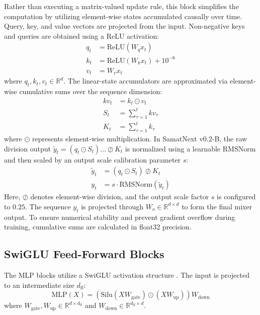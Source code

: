 \documentclass[11pt,a4paper]{article}
\begin{document}
Rather than executing a matrix-valued update rule, this block simplifies the computation by utilizing element-wise states accumulated causally over time. Query, key, and value vectors are projected from the input. Non-negative keys and queries are obtained using a ReLU activation:
\begin{align}
    q_t &= \text{ReLU}(W_q x_t) \\
    k_t &= \text{ReLU}(W_k x_t) + 10^{-6} \\
    v_t &= W_v x_t
\end{align}
where $q_t, k_t, v_t \in \mathbb{R}^d$. The linear-state accumulators are approximated via element-wise cumulative sums over the sequence dimension:
\begin{align}
    kv_t &= k_t \odot v_t \\
    S_t &= \sum_{\tau=1}^t kv_{\tau} \\
    K_t &= \sum_{\tau=1}^t k_{\tau}
\end{align}
where $\odot$ represents element-wise multiplication. In SamatNext v0.2-B, the raw division output $\tilde{y}_t = (q_t \odot S_t) \dots \oslash K_t$ is normalized using a learnable RMSNorm and then scaled by an output scale calibration parameter $s$:
\begin{align}
    \tilde{y}_t &= (q_t \odot S_t) \oslash K_t \\
    y_t &= s \cdot \text{RMSNorm}(\tilde{y}_t)
\end{align}
Here, $\oslash$ denotes element-wise division, and the output scale factor $s$ is configured to $0.25$. The sequence $y_t$ is projected through $W_o \in \mathbb{R}^{d \times d}$ to form the final mixer output. To ensure numerical stability and prevent gradient overflow during training, cumulative sums are calculated in float32 precision.

\subsection{SwiGLU Feed-Forward Blocks}
The MLP blocks utilize a SwiGLU activation structure \cite{shazeer2020glu}. The input is projected to an intermediate size $d_{\text{ff}}$:
\begin{equation}
    \text{MLP}(X) = \left(\text{Silu}(X W_{\text{gate}}) \odot (X W_{\text{up}})\right) W_{\text{down}}
\end{equation}
where $W_{\text{gate}}, W_{\text{up}} \in \mathbb{R}^{d \times d_{\text{ff}}}$ and $W_{\text{down}} \in \mathbb{R}^{d_{\text{ff}} \times d}$.
\end{document}
